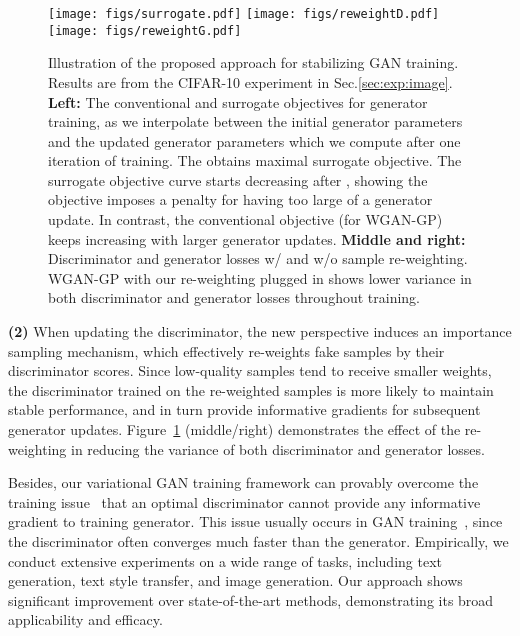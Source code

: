 \documentclass{article}
\newcommand{\0}{\bm{0}}
\begin{document}
\begin{figure}[t]
\begin{center}
\centerline{
\texttt{[image: figs/surrogate.pdf]}
\texttt{[image: figs/reweightD.pdf]}
\texttt{[image: figs/reweightG.pdf]}
}
\vspace{-4pt}
\caption{
Illustration of the proposed approach for stabilizing GAN training. Results are from the CIFAR-10 experiment in Sec.\ref{sec:exp:image}.
{\bf Left:} The conventional and surrogate objectives for generator training, as we interpolate between the initial generator parameters  and the updated generator parameters  which we compute after one iteration of training. The  obtains maximal surrogate objective. 
The surrogate objective curve starts decreasing after , showing the objective imposes a penalty for having too large of a generator update. In contrast, the conventional objective (for WGAN-GP) keeps increasing with larger generator updates. 
{\bf Middle and right:} Discriminator and generator losses w/ and w/o sample re-weighting. 
WGAN-GP with our re-weighting plugged in shows lower variance in both discriminator and generator losses throughout training. 
}
\label{fig:intro-stability}
\end{center}
\vspace{-6mm}
\end{figure}



{\bf (2)} When updating the discriminator, the new perspective induces an importance sampling mechanism, which effectively re-weights fake samples by their discriminator scores. Since low-quality samples tend to receive smaller weights, the discriminator trained on the re-weighted samples is more likely to maintain stable performance, and in turn provide informative gradients for subsequent generator updates. Figure~\ref{fig:intro-stability} (middle/right) demonstrates the effect of the re-weighting in reducing the variance of both discriminator and generator losses. 


Besides, our variational GAN training framework can provably overcome the training issue~\cite{lipschitz} that an optimal discriminator cannot provide any  informative gradient to training generator. This issue usually occurs in GAN training~\cite{lipschitz}, since the discriminator often converges much faster than the generator. Empirically, we conduct extensive experiments on a wide range of tasks, including text generation, text style transfer, and image generation. Our approach shows significant improvement over state-of-the-art methods, demonstrating its broad applicability and efficacy.
\end{document}
